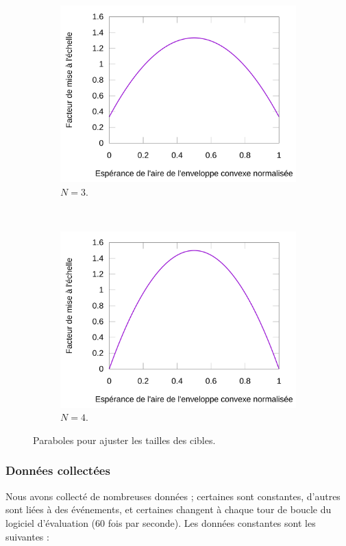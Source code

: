 \begin{figure}[htbp]
\begin{subfigure}[t]{0.49\textwidth}
			\includegraphics[width=\textwidth]{figures/ch5/parabola3}
			\caption{$N=3$.}
			\label{fig:parabola3}
		\end{subfigure}		
		~
		\begin{subfigure}[t]{0.49\textwidth}
			\centering
			\includegraphics[width=\textwidth]{figures/ch5/parabola4}
			\caption{$N=4$.}
			\label{fig:parabola4}
		\end{subfigure}
		\caption[Paraboles pour ajuster les tailles des cibles]{Paraboles pour ajuster les tailles des cibles.}
		\label{fig:parabolae}
	\end{figure}
		
	\subsubsection{Données collectées}
	Nous avons collecté de nombreuses données ; certaines sont constantes, d'autres sont liées à des événements, et certaines changent à chaque tour de boucle du logiciel d'évaluation (60 fois par seconde). Les données constantes sont les suivantes :
	
